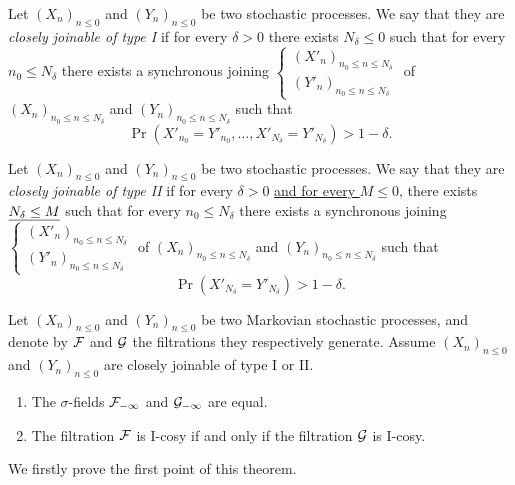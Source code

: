 \documentclass[12pt,a4paper]{article}
\begin{document}
\begin{definition}
Let ${(X_n)}_{n \leq 0}$ and ${(Y_n)}_{n \leq 0}$ be two stochastic processes. 
We say that they are \emph{closely joinable of type I} if for every $\delta >0$ there exists 
$N_\delta \leq 0$ such that for every $n_0 \leq N_\delta$ there exists a 
synchronous joining $\left\{\begin{smallmatrix} {(X'_n)}_{n_0 \leq n \leq N_\delta} \\ 
{(Y'_n)}_{n_0 \leq n \leq N_\delta}
\end{smallmatrix}\right.$ 
of ${(X_n)}_{n_0 \leq n \leq N_\delta}$ and ${(Y_n)}_{n_0 \leq n \leq N_\delta}$ 
such that 
$$
\Pr(X'_{n_0}=Y'_{n_0}, \ldots, X'_{N_\delta}=Y'_{N_\delta}) > 1-\delta. 
$$ 
\end{definition}

\begin{definition}
Let ${(X_n)}_{n \leq 0}$ and ${(Y_n)}_{n \leq 0}$ be two stochastic processes. 
We say that they are \emph{closely joinable of type II} if for every $\delta >0$ 
\uline{and for every $M\leq 0$}, there exists 
$\uline{N_\delta \leq M}$ such that for every $n_0 \leq N_\delta$ there exists a 
synchronous joining $\left\{\begin{smallmatrix} {(X'_n)}_{n_0 \leq n \leq N_\delta} \\ 
{(Y'_n)}_{n_0 \leq n \leq N_\delta}
\end{smallmatrix}\right.$ 
of ${(X_n)}_{n_0 \leq n \leq N_\delta}$ and ${(Y_n)}_{n_0 \leq n \leq N_\delta}$ 
such that 
$$
\Pr(X'_{N_\delta}=Y'_{N_\delta}) > 1-\delta. 
$$ 
\end{definition}

\begin{thm}\label{thm:joinable}
Let ${(X_n)}_{n \leq 0}$ and ${(Y_n)}_{n \leq 0}$ be two Markovian stochastic processes, and 
denote by $\mathcal{F}$ and $\mathcal{G}$ the filtrations they respectively generate. 
Assume ${(X_n)}_{n \leq 0}$ and ${(Y_n)}_{n \leq 0}$ are closely joinable of type I or II. 
\begin{enumerate}
\item The $\sigma$-fields $\mathcal{F}_{-\infty}$  and $\mathcal{G}_{-\infty}$ are equal. 

\item The filtration $\mathcal{F}$ is I-cosy if and only if the filtration $\mathcal{G}$ is I-cosy.
\end{enumerate}
\end{thm}

We firstly prove the first point of this theorem. 
\end{document}
